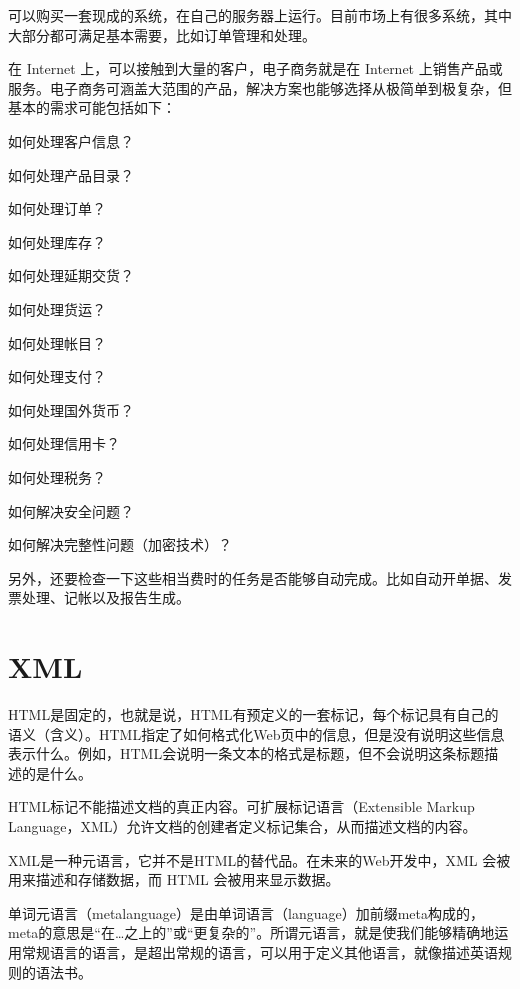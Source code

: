 可以购买一套现成的系统，在自己的服务器上运行。目前市场上有很多系统，其中大部分都可满足基本需要，比如订单管理和处理。

在 Internet 上，可以接触到大量的客户，电子商务就是在 Internet 上销售产品或服务。电子商务可涵盖大范围的产品，解决方案也能够选择从极简单到极复杂，但基本的需求可能包括如下：

\begin{compactitem}
\item 如何处理客户信息？
\item 如何处理产品目录？
\item 如何处理订单？
\item 如何处理库存？
\item 如何处理延期交货？
\item 如何处理货运？
\item 如何处理帐目？
\item 如何处理支付？
\item 如何处理国外货币？
\item 如何处理信用卡？
\item 如何处理税务？
\item 如何解决安全问题？
\item 如何解决完整性问题（加密技术）？
\end{compactitem}

另外，还要检查一下这些相当费时的任务是否能够自动完成。比如自动开单据、发票处理、记帐以及报告生成。



\chapter{XML}

HTML是固定的，也就是说，HTML有预定义的一套标记，每个标记具有自己的语义（含义）。HTML指定了如何格式化Web页中的信息，但是没有说明这些信息表示什么。例如，HTML会说明一条文本的格式是标题，但不会说明这条标题描述的是什么。

HTML标记不能描述文档的真正内容。可扩展标记语言（Extensible Markup Language，XML）允许文档的创建者定义标记集合，从而描述文档的内容。

XML是一种元语言，它并不是HTML的替代品。在未来的Web开发中，XML 会被用来描述和存储数据，而 HTML 会被用来显示数据。

单词元语言（metalanguage）是由单词语言（language）加前缀meta构成的，meta的意思是“在…之上的”或“更复杂的”。所谓元语言，就是使我们能够精确地运用常规语言的语言，是超出常规的语言，可以用于定义其他语言，就像描述英语规则的语法书。

